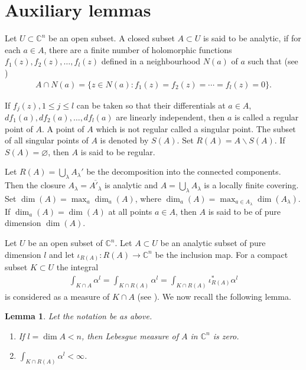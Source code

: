 \documentclass[11pt,reqno]{amsart}
\newtheorem{lem}{Lemma}[section]
\newcommand{\ol}{\overline}
\numberwithin{equation}{section}
\begin{document}
\section{{\bf Auxiliary lemmas}}
Let $U\subset \mathbb{C}^n$ be an open subset. A closed subset $A\subset U$ is said to be analytic, 
if for each $a\in A$, there are a finite number of holomorphic functions $f_1(z),f_2(z),\ldots,f_l(z)$ defined in a neighbourhood $N(a)$ of $a$ such that (see \cite[pp. 42]{NW})
\begin{align*}
\displaystyle A\cap N(a)=\{z\in N(a):f_1(z)=f_2(z)=\cdots=f_l(z)=0\}.
\end{align*}

\smallskip
If $f_j(z),1\leq j\leq l$ can be taken so that their differentials at $a\in A$, $df_1(a), df_2(a), \ldots,df_l(a)$ are linearly independent, then $a$ is called a regular point of $A$. A point of $A$ which is not regular called a singular point. The subset of all singular points of $A$ is denoted by $S(A)$. Set $R(A)=A\backslash  S(A)$. If $S(A)=\varnothing$, then $A$ is said to be regular. 

\smallskip
Let $R(A)=\bigcup_{\lambda}A_{\lambda}'$ be the decomposition into the connected components. Then the closure $A_{\lambda}=\ol{A'_{\lambda}}$ is analytic and $A=\bigcup_{\lambda}A_{\lambda}$ is a locally finite covering. Set $\dim(A)=\max_a \dim_a(A)$, where $\dim_a(A)=\max_{a\in A_{\lambda}}\dim(A_{\lambda})$. If $\dim_a(A)=\dim(A)$ at all points $a\in A$, then $A$ is said to be of pure dimension $\dim(A)$. 

Let $U$ be an open subset of $\mathbb{C}^n$. Let $A \subset U$ be an analytic subset of pure dimension $l$ and let  $\iota_{R(A)} : R(A)\longrightarrow \mathbb{C}^n$ be the inclusion map. For a compact subset $K\subset U$ the integral
\begin{align*}
 \displaystyle \int_{K\cap A} \alpha ^l=\int_{K\cap R(A)} \alpha^l = \int_{K\cap R(A)} {\iota}^{\ast} _{R(A)} \alpha^l
 \end{align*}
is considered as a measure of $K\cap A$ (see \cite[p. 45]{NW}). We now recall the following lemma.

\begin{lem}\cite[Lemma 2.2.9]{NW}\label{Lm0} Let the notation be as above.
\begin{enumerate}
\item[(i)] If $l=\dim A < n$, then Lebesgue measure of $A$ in $\mathbb{C}^n$ is zero.
\item [(ii)] $\int_{K\cap R(A)} \alpha^l < \infty$.
\end{enumerate}
\end{lem}
\end{document}

